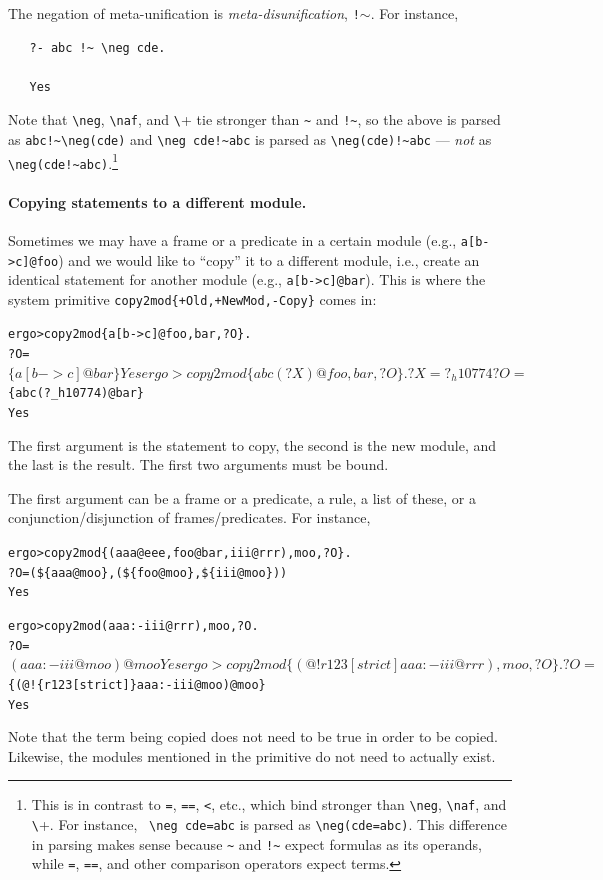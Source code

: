 \documentclass[11pt]{article}
\newcommand{\prompt}{ergo> }
\newcommand{\bs}{\textbackslash}
\newcommand{\PLGNAF}{\mbox{\texttt{\bs}+}\xspace}
\newcommand{\RULELOGNAF}{{\texttt{{\bs}naf}}\xspace}
\begin{document}
The negation of meta-unification is \emph{meta-disunification}, {\tt !$\sim$}. 
For instance,
\begin{verbatim}
   ?- abc !~ \neg cde.

   Yes
\end{verbatim}
Note that {\tt \bs{}neg}, \RULELOGNAF, and \PLGNAF tie stronger than \verb|~| and
\verb|!~|, so the above is parsed as \verb|abc!~\neg(cde)| and
\verb|\neg cde!~abc| is parsed as  \verb|\neg(cde)!~abc| --- \emph{not} as
\verb|\neg(cde!~abc)|.\footnote{
  This is in contrast to {\tt =}, {\tt ==}, {\tt <}, etc., which bind
  stronger than {\tt \bs{}neg}, \RULELOGNAF, and \PLGNAF. For instance, {\tt
    \bs{}neg
    cde=abc} is parsed as {\tt \bs{}neg(cde=abc)}. This difference in parsing
  makes sense because {\tt \~{}}  and
  {\tt !\~{}}  expect formulas as its
  operands, while {\tt =}, {\tt ==}, and other comparison operators expect
  terms.
  }


\paragraph{Copying statements to a different module.}
Sometimes we may have a frame or a predicate in a certain module (e.g.,
\texttt{a[b->c]@foo})
and we would like to ``copy'' it to a different module, i.e., create an
identical statement for another module (e.g., \texttt{a[b->c]@bar}).
This is where the system primitive \texttt{copy2mod\{+Old,+NewMod,-Copy\}} comes in:
\begin{alltt}
   \prompt copy2mod\{a[b->c]@foo,bar,?O\}.
   ?O = $\{a[b->c]@bar\}
   Yes

   \prompt copy2mod\{abc(?X)@foo,bar,?O\}.
   ?X = ?_h10774
   ?O = $\{abc(?_h10774)@bar\}
   Yes
\end{alltt}
The first argument is the statement to copy, the second is the new module,
and the last is the result. The first two arguments must be bound.

The first argument can be a frame or a predicate, a rule, a list of these,
or a conjunction/disjunction of frames/predicates.
For instance,
\begin{alltt}
   \prompt copy2mod\{(aaa@eee,foo@bar,iii@rrr),moo,?O\}.
   ?O = (\$\{aaa@moo\}, (\$\{foo@moo\}, \$\{iii@moo\}))
   Yes

   \prompt copy2mod{(aaa :- iii@rrr),moo,?O}.
   ?O = ${(aaa :- iii@moo)@moo}
   Yes

   \prompt copy2mod\{(@!{r123[strict]} aaa :- iii@rrr),moo,?O\}.
   ?O = $\{(@!\{r123[strict]\} aaa :- iii@moo)@moo\}
   Yes
\end{alltt}
Note that the term being copied does not need to be true in order to be copied.
Likewise, the modules mentioned in the primitive do not need to actually
exist.
\end{document}
